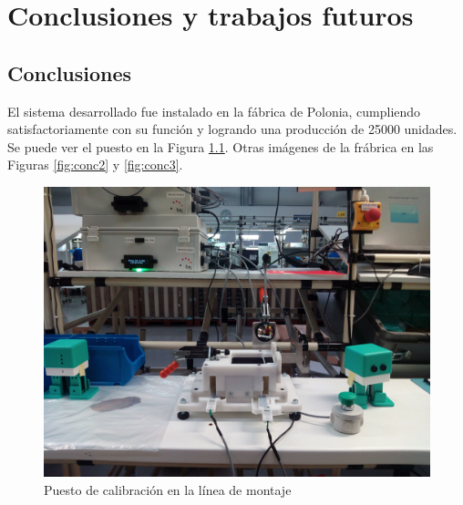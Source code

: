 
\chapter{Conclusiones y trabajos futuros} %

\label{Chapter4} %


\section{Conclusiones}

El sistema desarrollado fue instalado en la fábrica de Polonia, cumpliendo satisfactoriamente con su función y logrando una producción de 25000 unidades. Se puede ver el puesto en la Figura \ref{fig:conc1}. Otras imágenes de la frábrica en las Figuras \ref{fig:conc2} y \ref{fig:conc3}.

\begin{figure}[h]
\centering
\includegraphics[width=135mm]{Figures/conc1.jpg}
\caption[Puesto de calibración en la línea de montaje]{Puesto de calibración en la línea de montaje}
\label{fig:conc1}
\end{figure}

